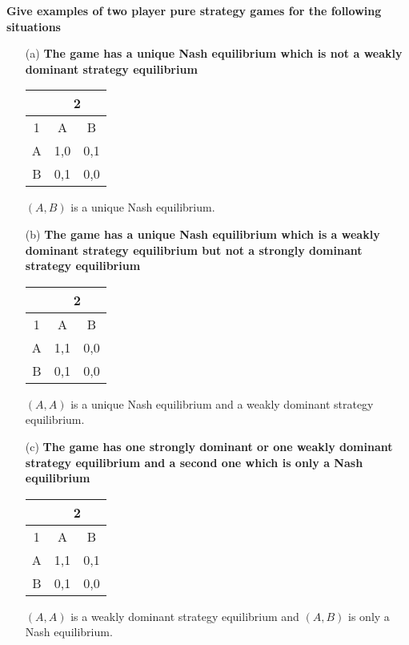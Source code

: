 \documentclass[12pt, a4paper]{article}
\begin{document}
\textbf{Give examples of two player pure strategy games for the following situations}

\begin{enumerate}
	\item[(a)] \textbf{The game has a unique Nash equilibrium which is not a weakly dominant strategy equilibrium}
	
	\begin{table}[ht!]
		\centering
		\begin{tabular}{|c|c|c|} \hline
			& \multicolumn{2}{|c|}{2} \\ \hline
			1 & A & B \\ \hline
			A & 1,0 & 0,1 \\ \hline
			B & 0,1 & 0,0 \\ \hline
		\end{tabular}
	\end{table}
	
	$(A,B)$ is a unique Nash equilibrium.
	
	\item[(b)] \textbf{The game has a unique Nash equilibrium which is a weakly dominant strategy equilibrium but not a strongly dominant strategy equilibrium}
	
	\begin{table}[ht!]
		\centering
		\begin{tabular}{|c|c|c|} \hline
			& \multicolumn{2}{|c|}{2} \\ \hline
			1 & A & B \\ \hline
			A & 1,1 & 0,0 \\ \hline
			B & 0,1 & 0,0 \\ \hline
		\end{tabular}
	\end{table}
	
	$(A,A)$ is a unique Nash equilibrium and a weakly dominant strategy equilibrium.
	
	\item[(c)] \textbf{The game has one strongly dominant or one weakly dominant strategy equilibrium and a second one which is only a Nash equilibrium}
	
	\begin{table}[ht!]
		\centering
		\begin{tabular}{|c|c|c|} \hline
			& \multicolumn{2}{|c|}{2} \\ \hline
			1 & A & B \\ \hline
			A & 1,1 & 0,1 \\ \hline
			B & 0,1 & 0,0 \\ \hline
		\end{tabular}
	\end{table}
	
	$(A,A)$ is a weakly dominant strategy equilibrium and $(A,B)$ is only a Nash equilibrium.
	
\end{enumerate}
\end{document}
